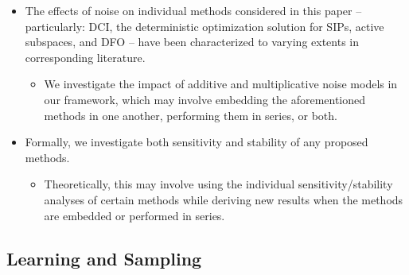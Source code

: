 \documentclass[11pt]{beamer}
\begin{document}
\begin{frame}

\begin{itemize}

	\item The effects of noise on individual methods considered in this paper -- particularly: DCI, the deterministic optimization solution for SIPs, active subspaces, and DFO -- have been characterized to varying extents in corresponding literature. 
	
\begin{itemize}

		\item 	We investigate the impact of additive and multiplicative noise models in our framework, which may involve embedding the aforementioned methods in one another, performing them in series, or both.

\end{itemize}	


\item Formally, we investigate both sensitivity and stability of any proposed methods. 

\begin{itemize}

		\item Theoretically, this may involve using the individual sensitivity/stability analyses of certain methods while deriving new results when the methods are embedded or performed in series. 
		

\end{itemize}


\end{itemize}

\end{frame}

\subsection{Learning and Sampling}
\end{document}
